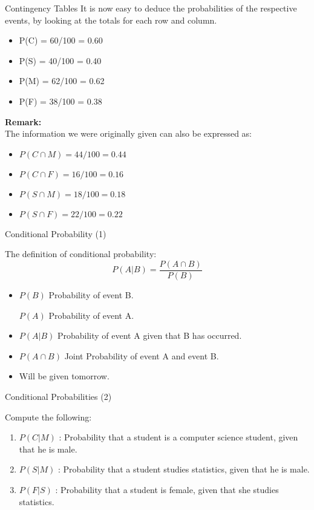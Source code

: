 \documentclass[]{report}
\begin{document}
{{{{{{{}
{
	{Contingency Tables}
	It is now easy to deduce the probabilities of the respective events, by looking at the totals for each row and column.
	\begin{itemize}
		\item P(C) = 60/100 = 0.60
		\item P(S) = 40/100 = 0.40
		\item P(M) = 62/100 = 0.62
		\item P(F) = 38/100 = 0.38
	\end{itemize}
	\textbf{Remark:}\\
	The information we were originally given can also be expressed as:
	\begin{itemize}
		\item $P(C \cap M) = 44/100 = 0.44$
		\item $P(C \cap F) = 16/100 = 0.16$
		\item $P(S \cap M) = 18/100 = 0.18$
		\item $P(S \cap F) = 22/100 = 0.22$
	\end{itemize}
}

{
	{Conditional Probability (1)}
	
	The definition of conditional probability:
	\[ P(A|B) = \frac{P(A \cap B)}{P(B)} \]
	
	\begin{itemize}
		\item $P(B)$ Probability of event B.
		\item [ $P(A)$ Probability of event A. ]
		\item $P(A|B)$ Probability of event A given that B has occurred.
		\item $P(A \cap B)$ Joint Probability of event A and event B.
		\item Will be given tomorrow.
	\end{itemize}
	
}


{
	{Conditional Probabilities (2)}
	
	Compute the following:
	\begin{enumerate}
		\item $P(C|M)$ : Probability that a student is a computer science student, given that he is male.
		\item $P(S|M)$ : Probability that a student studies statistics, given that he is male.
		\item $P(F|S)$ : Probability that a student is female, given that she studies statistics.
	\end{enumerate}
	
}}}}}}}
\end{document}
